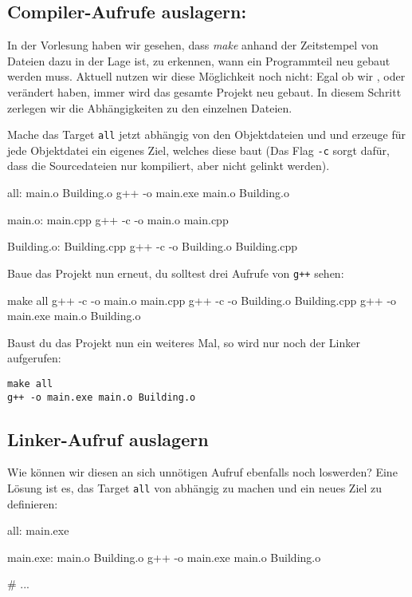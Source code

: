 \subsection{Compiler-Aufrufe auslagern:}
In der Vorlesung haben wir gesehen, dass \emph{make} anhand der Zeitstempel von Dateien dazu in der Lage ist, zu erkennen, wann ein Programmteil neu gebaut werden muss.
Aktuell nutzen wir diese Möglichkeit noch nicht:
Egal ob wir ,  oder  verändert haben, immer wird das gesamte Projekt neu gebaut.
In diesem Schritt zerlegen wir die Abhängigkeiten zu den einzelnen Dateien.

Mache das Target \texttt{all} jetzt abhängig von den Objektdateien  und  und erzeuge für jede Objektdatei ein eigenes Ziel, welches diese baut (Das Flag \texttt{-c} sorgt dafür, dass die Sourcedateien nur kompiliert, aber nicht gelinkt werden).
\begin{minipage}{\textwidth}
\begin{lstmake}
all: main.o Building.o
    g++ -o main.exe main.o Building.o

main.o: main.cpp
    g++ -c -o main.o main.cpp

Building.o: Building.cpp
    g++ -c -o Building.o Building.cpp
\end{lstmake}
\end{minipage}

Baue das Projekt nun erneut, du solltest drei Aufrufe von \texttt{g++} sehen:

\begin{minipage}{\textwidth}
\begin{lstmake}
make all
g++ -c -o main.o main.cpp
g++ -c -o Building.o Building.cpp
g++ -o main.exe main.o Building.o
\end{lstmake}
\end{minipage}

Baust du das Projekt nun ein weiteres Mal, so wird nur noch der Linker aufgerufen:
\begin{verbatim}
make all
g++ -o main.exe main.o Building.o
\end{verbatim}

\subsection{Linker-Aufruf auslagern}
Wie können wir diesen an sich unnötigen Aufruf ebenfalls noch loswerden?
Eine Lösung ist es, das Target \texttt{all} von  abhängig zu machen und ein neues Ziel  zu definieren:
\begin{lstmake}
all: main.exe

main.exe: main.o Building.o
    g++ -o main.exe main.o Building.o

# ...
\end{lstmake}

